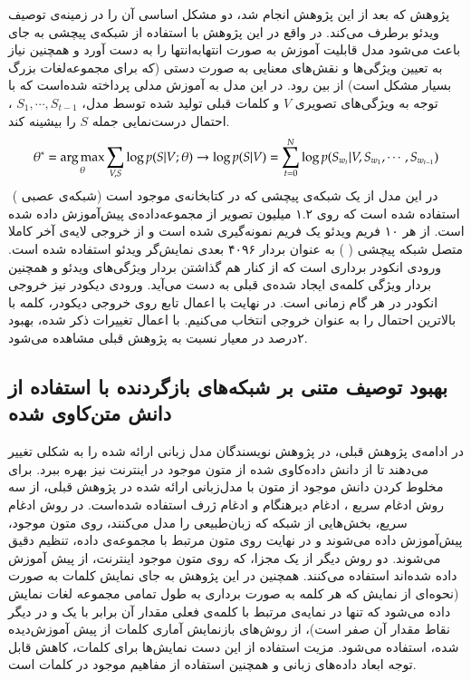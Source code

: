 پژوهش
 \cite{Venugopalan2015}
  که بعد از این پژوهش انجام شد، دو مشکل اساسی آن را در زمینه‌ی توصیف ویدئو برطرف می‌کند. در واقع در این پژوهش با استفاده از شبکه‌ی پیچشی به جای 
باعث می‌شود مدل قابلیت آموزش به صورت انتها‌به‌انتها
را به دست آورد و همچنین نیاز به تعیین ویژگی‌ها و نقش‌های معنایی به صورت دستی (که برای مجموعه‌لغات بزرگ بسیار مشکل است) از بین رود. در این مدل به آموزش مدلی پرداخته‌ شده‌است که با توجه به ویژگی‌های تصویری $V$ و کلمات قبلی تولید شده توسط مدل،
 $S_1, \cdots , S_{t-1}$
 ، احتمال درست‌نمایی جمله $S$ را بیشینه کند.
 \begin{align}
	 \theta^* = \operatorname*{arg\,max}_\theta \sum_{V,S}\log p(S|V; \theta)  \rightarrow \log p(S|V) = \sum_{t=0}^N \log p(S_{w_t}|V, S_{w_1}, \cdots, S_{w_{t-1}})
 \end{align}‌
 در این مدل از یک‌ شبکه‌ی پیچشی که در کتابخانه‌ی 
  \cite{jia2014caffe}
 موجود است (شبکه‌ی عصبی 
  \cite{krizhevsky2012imagenet}
  ) استفاده شده است که روی ۱.۲ میلیون تصویر از مجموعه‌داده‌ی 
  \cite{russakovsky2015imagenet} 
پیش‌آموزش داده‌‌ شده است. از هر ۱۰ فریم ویدئو یک فریم نمونه‌گیری شده است و از خروجی لایه‌ی آخر کاملا متصل شبکه پیچشی (
) به عنوان بردار ۴۰۹۶ بعدی نمایش‌گر ویدئو استفاده شده است. ورودی انکودر برداری است که از کنار هم گذاشتن بردار ویژگی‌های ویدئو و همچنین بردار ویژگی کلمه‌ی ایجاد شده‌ی قبلی به دست می‌آید. ورودی دیکودر نیز خروجی انکودر در هر گام زمانی است. در نهایت با اعمال تابع  روی خروجی دیکودر، کلمه با بالاترین احتمال را به عنوان خروجی انتخاب می‌کنیم. با اعمال تغییرات ذکر شده، بهبود ۲درصد در معیار  نسبت به پژوهش قبلی مشاهده می‌شود.
 \subsection{بهبود توصیف متنی بر شبکه‌های بازگردنده با استفاده از دانش متن‌کاوی شده}\label{rrns-and-text-mined-knowledge}
 در ادامه‌ی پژوهش قبلی، در پژوهش 
\cite{Venugopalan2016}
نویسندگان مدل زبانی ارائه شده را به شکلی تغییر می‌دهند تا از دانش داده‌کاوی شده از متون موجود در اینترنت نیز بهره ببرد. برای مخلوط کردن دانش موجود از متون با مدل‌زبانی ارائه شده در پژوهش قبلی، از سه روش ادغام سریع
، ادغام دیر‌هنگام
 و ادغام ژرف 
 استفاده شده‌است. در روش ادغام سریع، بخش‌هایی از شبکه که زبان‌طبیعی را مدل می‌کنند، روی متون موجود، پیش‌آموزش داده می‌شوند و در نهایت روی متون مرتبط با مجموعه‌ی داده، تنظیم دقیق
 می‌شوند. دو روش دیگر از یک  مجزا، که روی متون موجود اینترنت، از پیش‌ آموزش داده شده‌اند استفاده می‌کنند. همچنین در این پژوهش به جای نمایش کلمات به صورت  (نحوه‌ای از نمایش که هر کلمه به صورت برداری به طول تمامی مجموعه لغات نمایش داده می‌شود که تنها در نمایه‌ی مرتبط با کلمه‌ی فعلی مقدار آن برابر با یک و در دیگر نقاط مقدار آن صفر است)، از روش‌های بازنمایش آماری کلمات از پیش آموزش‌دیده شده، استفاده می‌شود. مزیت استفاده از این دست نمایش‌ها برای کلمات، کاهش قابل توجه ابعاد داده‌ها‌ی زبانی و همچنین استفاده از مفاهیم موجود در کلمات است.
 
